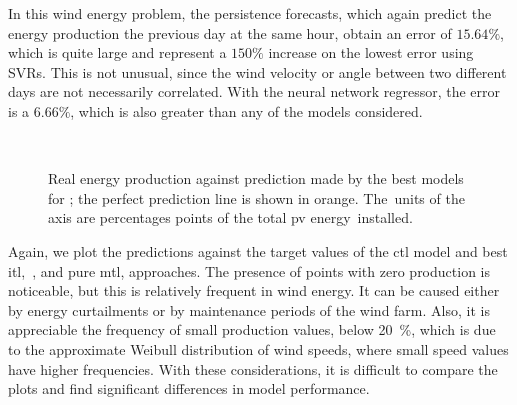 %
In this wind energy problem, the persistence forecasts, which again predict the energy production the previous day at the same hour, obtain an error of $15.64\%$, which is quite large and represent a $150\%$ increase on the lowest error using SVRs. This is not unusual, since the wind velocity or angle between two different days are not necessarily correlated.
%
With the neural network regressor, the error is a $6.66\%$, which is also greater than any of the models considered.

\begin{figure}[t!]
    \centering%
    \quad%
    \quad%
    \\
 \caption{\label{fig:stv_best_plots} Real energy production against prediction made by the best models for ; the perfect prediction line is shown in orange. The~units of the axis are percentages points of the total \acrshort{pv} energy~installed.}
 \end{figure}

%
Again, we plot the predictions against the target values of the \acrshort{ctl} model and best \acrshort{itl},~, and pure \acrshort{mtl},  approaches.
The presence of points with zero production is noticeable, but this is relatively frequent in wind energy. It can be caused either by energy curtailments or by maintenance periods of the wind farm.
Also, it is appreciable the frequency of small production values, below \SI{20}{\percent}, which is due to the approximate Weibull distribution of wind speeds, where small speed values have higher frequencies. 
With these considerations, it is difficult to compare the plots and find significant differences in model performance.








